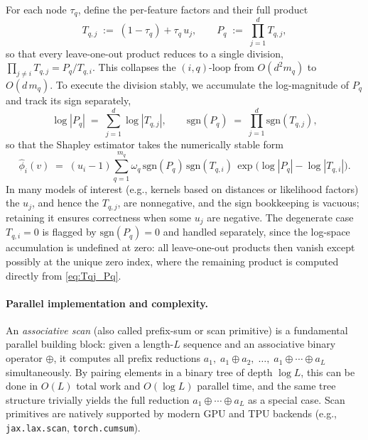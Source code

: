 \documentclass{article}
\begin{document}
For each node $\tau_q$, define the per-feature factors and their full product
\begin{equation}
\label{eq:Tqj_Pq}
T_{q,j}\;:=\;(1-\tau_q)+\tau_q\,u_j, \qquad
P_q\;:=\;\prod_{j=1}^d T_{q,j},
\end{equation}
so that every leave-one-out product reduces to a single division, $\prod_{j\neq i} T_{q,j} = P_q / T_{q,i}$. This collapses the $(i,q)$-loop from $O(d^2 m_q)$ to $O(d\,m_q)$. To execute the division stably, we accumulate the log-magnitude of $P_q$ and track its sign separately,
\begin{equation}
\label{eq:logP_signP}
\log |P_q| \;=\; \sum_{j=1}^d \log |T_{q,j}|,
\qquad
\mathrm{sgn}(P_q) \;=\; \prod_{j=1}^d \mathrm{sgn}(T_{q,j}),
\end{equation}
so that the Shapley estimator takes the numerically stable form
\begin{equation}
\label{eq:gl_logspace_phi}
\widehat{\phi}_i(v)
\;=\;
(u_i-1)
\sum_{q=1}^{m_q} \omega_q\,
\mathrm{sgn}(P_q)\,\mathrm{sgn}(T_{q,i})\,
\exp\!\bigl(\log|P_q|-\log|T_{q,i}|\bigr).
\end{equation}
In many models of interest (e.g., kernels based on distances or likelihood factors) the $u_j$, and hence the $T_{q,j}$, are nonnegative, and the sign bookkeeping is vacuous; retaining it ensures correctness when some $u_j$ are negative. The degenerate case $T_{q,i}=0$ is flagged by $\mathrm{sgn}(P_q)=0$ and handled separately, since the log-space accumulation is undefined at zero: all leave-one-out products then vanish except possibly at the unique zero index, where the remaining product is computed directly from \cref{eq:Tqj_Pq}.


\paragraph{Parallel implementation and complexity.}
An \emph{associative scan} (also called prefix-sum or scan primitive) is a fundamental parallel building block: given a length-$L$ sequence and an associative binary operator $\oplus$, it computes all prefix reductions $a_1,\; a_1\oplus a_2,\;\dots,\;a_1\oplus\cdots\oplus a_L$ simultaneously. By pairing elements in a binary tree of depth $\log L$, this can be done in $O(L)$ total work and $O(\log L)$ parallel time, and the same tree structure trivially yields the full reduction $a_1\oplus\cdots\oplus a_L$ as a special case. Scan primitives are natively supported by modern GPU and TPU backends (e.g., \texttt{jax.lax.scan}, \texttt{torch.cumsum}).
\end{document}
